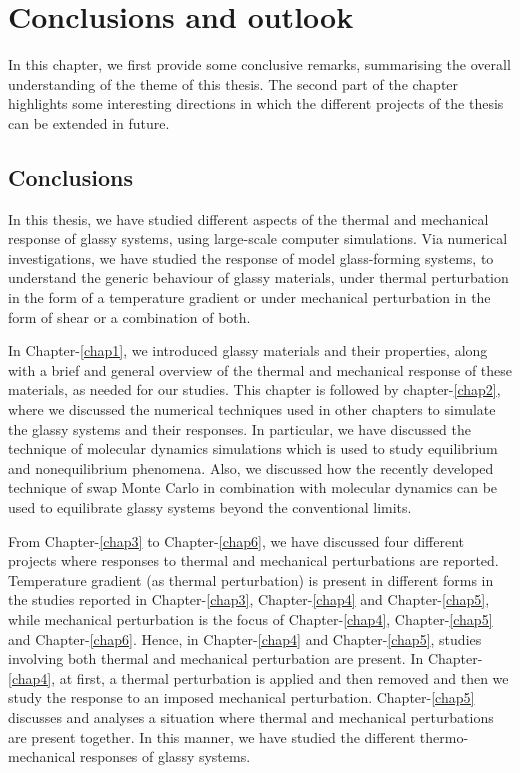 \pagestyle{fancy}
\fancyhf{}
\renewcommand{\headrulewidth}{0pt}
\fancyfoot[C]{\leftmark}
\fancyhead[R]{\thepage}
\doublespacing

\chapter{Conclusions and outlook}\label{chap7}
In this chapter, we first provide some conclusive remarks, summarising the overall understanding of the theme of this thesis. The second part of the chapter highlights some interesting directions in which the different projects of the thesis can be extended in future.


\section{Conclusions}
In this thesis, we have studied different aspects of the thermal and mechanical response of glassy systems, using large-scale computer simulations. Via numerical investigations, we have studied the response of model glass-forming systems, to understand the generic behaviour of glassy materials, under thermal perturbation in the form of a temperature gradient or under mechanical perturbation in the form of shear or a combination of both.


In Chapter-\ref{chap1}, we introduced glassy materials and their properties, along with a brief and general overview of the thermal and mechanical response of these materials, as needed for our studies. This chapter is followed by chapter-\ref{chap2}, where we discussed the numerical techniques used in other chapters to simulate the glassy systems and their responses. In particular, we have discussed the technique of molecular dynamics simulations which is used to study equilibrium and nonequilibrium phenomena. Also, we discussed how the recently developed technique of swap Monte Carlo in combination with molecular dynamics can be used to equilibrate glassy systems beyond the conventional limits.


From Chapter-\ref{chap3} to Chapter-\ref{chap6}, we have discussed four different projects where responses to thermal and mechanical perturbations are reported. Temperature gradient (as thermal perturbation) is present in different forms in the studies reported in Chapter-\ref{chap3}, Chapter-\ref{chap4} and Chapter-\ref{chap5}, while mechanical perturbation is the focus of Chapter-\ref{chap4}, Chapter-\ref{chap5} and Chapter-\ref{chap6}. Hence, in Chapter-\ref{chap4} and Chapter-\ref{chap5}, studies involving both thermal and mechanical perturbation are present. In Chapter-\ref{chap4}, at first, a thermal perturbation is applied and then removed and then we study the response to an imposed mechanical perturbation. Chapter-\ref{chap5} discusses and analyses a situation where thermal and mechanical perturbations are present together. In this manner, we have studied the different thermo-mechanical responses of glassy systems.

